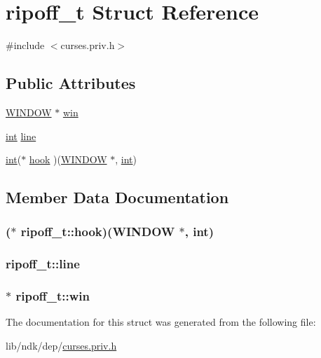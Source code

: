 \hypertarget{structripoff__t}{\section{ripoff\-\_\-t Struct Reference}
\label{structripoff__t}
}


{\ttfamily \#include $<$curses.\-priv.\-h$>$}

\subsection*{Public Attributes}
\begin{DoxyCompactItemize}
\item 
\hyperlink{curses_8priv_8h_aa64cc90e7a4df667d6c7249b77890d39}{W\-I\-N\-D\-O\-W} $\ast$ \hyperlink{structripoff__t_a39ae55d3aa2245e593fbe6fc6ebc9de7}{win}
\item 
\hyperlink{term__entry_8h_ad65b480f8c8270356b45a9890f6499ae}{int} \hyperlink{structripoff__t_a528f571e75c65a34930ebd748b25f5f0}{line}
\item 
\hyperlink{term__entry_8h_ad65b480f8c8270356b45a9890f6499ae}{int}($\ast$ \hyperlink{structripoff__t_ac29a6bb927c106e46045d3132e5ac688}{hook} )(\hyperlink{curses_8priv_8h_aa64cc90e7a4df667d6c7249b77890d39}{W\-I\-N\-D\-O\-W} $\ast$, \hyperlink{term__entry_8h_ad65b480f8c8270356b45a9890f6499ae}{int})
\end{DoxyCompactItemize}


\subsection{Member Data Documentation}
\hypertarget{structripoff__t_ac29a6bb927c106e46045d3132e5ac688}{
\subsubsection[{hook}]{($\ast$ ripoff\-\_\-t\-::hook)({\bf W\-I\-N\-D\-O\-W} $\ast$, {\bf int})}}\label{structripoff__t_ac29a6bb927c106e46045d3132e5ac688}
\hypertarget{structripoff__t_a528f571e75c65a34930ebd748b25f5f0}{
\subsubsection[{line}]{ ripoff\-\_\-t\-::line}}\label{structripoff__t_a528f571e75c65a34930ebd748b25f5f0}
\hypertarget{structripoff__t_a39ae55d3aa2245e593fbe6fc6ebc9de7}{
\subsubsection[{win}]{$\ast$ ripoff\-\_\-t\-::win}}\label{structripoff__t_a39ae55d3aa2245e593fbe6fc6ebc9de7}


The documentation for this struct was generated from the following file\-:\begin{DoxyCompactItemize}
\item 
lib/ndk/dep/\hyperlink{curses_8priv_8h}{curses.\-priv.\-h}\end{DoxyCompactItemize}
